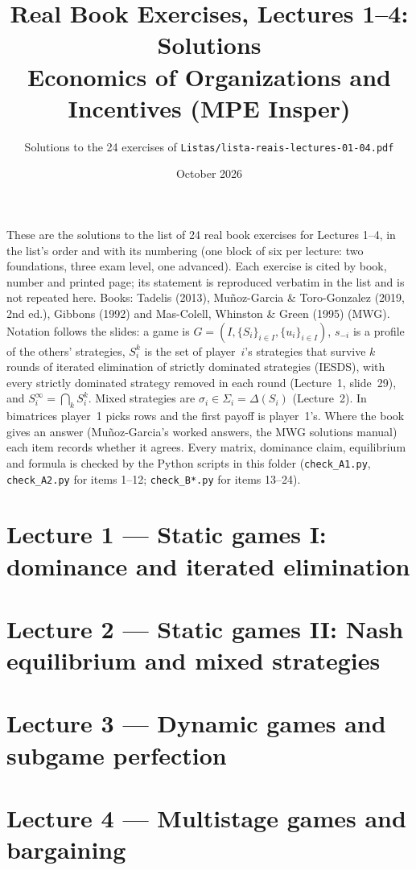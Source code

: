 \documentclass[11pt,a4paper]{article}
\title{\textbf{Real Book Exercises, Lectures 1--4: Solutions}\\[4pt]
  \large Economics of Organizations and Incentives (MPE Insper)}
\author{Solutions to the 24 exercises of \texttt{Listas/lista-reais-lectures-01-04.pdf}}
\date{October 2026}
\newcommand{\MG}{Mu\~noz-Garcia}
\newcommand{\sm}{s_{-i}}
\begin{document}
\maketitle
\thispagestyle{empty}

\noindent These are the solutions to the list of 24 real book exercises for Lectures 1--4, in
the list's order and with its numbering (one block of six per lecture: two foundations, three exam
level, one advanced). Each exercise is cited by book, number and printed page; its statement is
reproduced verbatim in the list and is not repeated here. Books: Tadelis (2013), \MG{} \&
Toro-Gonzalez (2019, 2nd ed.), Gibbons (1992) and Mas-Colell, Whinston \& Green (1995) (MWG).
Notation follows the slides: a game is $G = (I, \{S_i\}_{i\in I}, \{u_i\}_{i\in I})$, $\sm$ is a
profile of the others' strategies, $S_i^k$ is the set of player~$i$'s strategies that survive $k$
rounds of iterated elimination of strictly dominated strategies (IESDS), with every strictly
dominated strategy removed in each round (Lecture~1, slide~29), and $S_i^\infty = \bigcap_k
S_i^k$. Mixed strategies are $\sigma_i \in \Sigma_i = \Delta(S_i)$ (Lecture~2). In bimatrices
player~1 picks rows and the first payoff is player~1's. Where the book gives an answer (\MG{}'s
worked answers, the MWG solutions manual) each item records whether it agrees. Every matrix,
dominance claim, equilibrium and formula is checked by the Python scripts in this folder
(\texttt{check\_A1.py}, \texttt{check\_A2.py} for items 1--12; \texttt{check\_B*.py} for items
13--24).

\tableofcontents
\newpage

\part*{Lecture 1 --- Static games I: dominance and iterated elimination}







\part*{Lecture 2 --- Static games II: Nash equilibrium and mixed strategies}







\part*{Lecture 3 --- Dynamic games and subgame perfection}







\part*{Lecture 4 --- Multistage games and bargaining}






\end{document}
